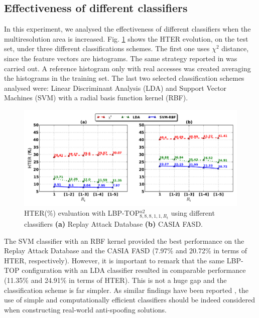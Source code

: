 \subsection{Effectiveness of different classifiers}
\label{sec_different_classifiers}

In this experiment, we analysed the effectiveness of different classifiers when the multiresolution area is increased. Fig. \ref{fig:evaluation_classifiers} shows the HTER evolution, on the test set, under three different classifications schemes. The first one uses $\chi^2$ distance, since the feature vectors are histograms. The same strategy reported in \cite{ChingovskaBIOSIG2012} was carried out. A reference histogram only with real accesses was created averaging the histograms in the training set. The last two selected classification schemes analysed were: Linear Discriminant Analysis (LDA) and Support Vector Machines (SVM) with a radial basis function kernel (RBF).

\begin{figure}[!btb]
\begin{center}
\includegraphics [width=\textwidth] {images/proposed_countermeasure/evaluation_classifiers.pdf}
\caption[HTER(\%) evaluation with LBP-TOP$_{8,8,8,1,1,R_t}^{u2}$ using different classifiers]{HTER(\%) evaluation with LBP-TOP$_{8,8,8,1,1,R_t}^{u2}$ using different classifiers \textbf{(a)} Replay Attack Database \textbf{(b)} CASIA FASD.} \label{fig:evaluation_classifiers}
\end{center}
\end{figure}


The SVM classifier with an RBF kernel provided the best performance on the Replay Attack Database and the CASIA FASD (7.97\% and 20.72\% in terms of HTER, respectively). However, it is important to remark that the same LBP-TOP configuration with an LDA classifier resulted in comparable performance (11.35\% and 24.91\% in terms of HTER). This is not a huge gap and the classification scheme is far simpler. As similar findings have been reported \cite{ChingovskaBIOSIG2012,Komulainen_ICB_2013}, the use of simple and computationally efficient classifiers should be indeed considered when constructing real-world anti-spoofing solutions.


